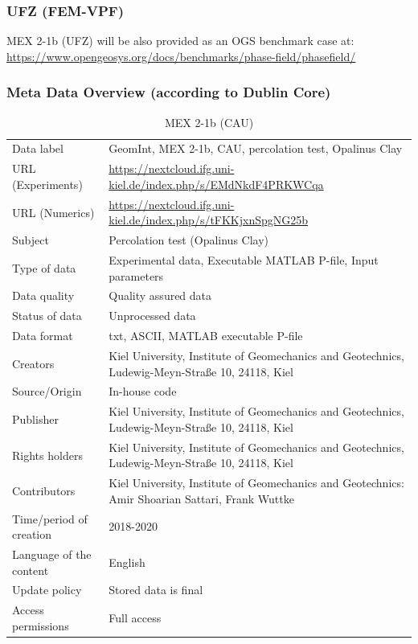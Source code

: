 \subsubsection*{UFZ (FEM-VPF)}

MEX 2-1b (UFZ) will be also provided as an OGS benchmark case at:\\
\small
\url{https://www.opengeosys.org/docs/benchmarks/phase-field/phasefield/}
\normalsize

\subsubsection*{Meta Data Overview (according to Dublin Core)}

\begin{table}[!ht]
\caption{MEX 2-1b (CAU)}
\label{tab:dms-mex2-1b}
\small
\begin{tabular}{R{3.5cm}|L{7.5cm}}
\hline
%
Data label & GeomInt, MEX 2-1b, CAU, percolation test, Opalinus Clay \\
URL (Experiments) & \url{https://nextcloud.ifg.uni-kiel.de/index.php/s/EMdNkdF4PRKWCqa} \\
URL (Numerics) & \url{https://nextcloud.ifg.uni-kiel.de/index.php/s/tFKKjxnSpgNG25b}  \\
Subject  &  Percolation test (Opalinus Clay)\\
Type of data  & Experimental data, Executable MATLAB P-file, Input parameters\\
Data quality  &  Quality assured data \\
Status of data  &  Unprocessed data\\
Data format  & txt, ASCII, MATLAB executable P-file\\
Creators  &  Kiel University, Institute of Geomechanics and Geotechnics, Ludewig-Meyn-Stra\ss e 10, 24118, Kiel\\
Source/Origin & In-house code \\
Publisher  &  Kiel University, Institute of Geomechanics and Geotechnics, Ludewig-Meyn-Stra\ss e 10, 24118, Kiel \\
Rights holders &  Kiel University, Institute of Geomechanics and Geotechnics, Ludewig-Meyn-Stra\ss e 10, 24118, Kiel \\
Contributors &   Kiel University, Institute of Geomechanics and Geotechnics: Amir Shoarian Sattari, Frank Wuttke\\
Time/period of creation &  2018-2020\\
Language of the content &  English\\
Update policy &  Stored data is final\\
Access permissions & Full access\\
%
\hline
\end{tabular}
\end{table}

